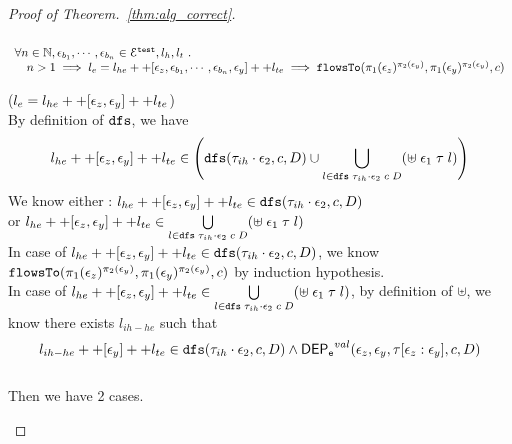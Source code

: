 \begin{proof}[Proof of Theorem.~\ref{thm:alg_correct}]
\begin{case}
\begin{equation}
  \end{equation}
%
%
\begin{equation}
\begin{array}{l}
  \forall n \in \mathbb{N}, \mathtt{\epsilon}_{b_1}, \cdots, \mathtt{\epsilon}_{b_n} \in \mathcal{E}^{\mathtt{{test}}}, l_h, l_t ~.~
   \\ \quad 
   n > 1 \implies
   l_e = l_{he} ++ {[\mathtt{\epsilon}_z, \mathtt{\epsilon}_{b_1}, \cdots, \mathtt{\epsilon}_{b_n}, \mathtt{\epsilon}_y]} ++ l_{te}
  \implies \mathtt{flowsTo}(\pi_1(\mathtt{\epsilon}_z)^{\pi_2(\mathtt{\epsilon}_y)}, \pi_1(\mathtt{\epsilon}_y)^{\pi_2(\mathtt{\epsilon}_y)}, c)
\end{array}
\end{equation}
%
\begin{subcase}($l_e = l_{he} ++ [\mathtt{\epsilon}_z, \mathtt{\epsilon}_y] ++ l_{te}$)
\\
By definition of $\mathtt{dfs}$, we have
%
\[
  l_{he} ++ [\event_z, \event_y] ++ l_{te}  \in 
  \left(  \kw{dfs}(\trace_{ih} \cdot \event_2, c, D) \cup
  \bigcup\limits_{l \in \kw{dfs} \eapp {\trace_{ih} \cdot \event_2} \eapp c \eapp D } (\uplus \eapp \event_1 \eapp \trace \eapp l)
  \right)
\]
We know either :
$l_{he} ++ [\mathtt{\epsilon}_z, \mathtt{\epsilon}_y] ++ l_{te}  \in \mathtt{dfs}(\mathtt{\tau}_{ih} \cdot \mathtt{\epsilon}_2, c, D)$
\\
or $l_{he} ++ [\mathtt{\epsilon}_z, \mathtt{\epsilon}_y] ++ l_{te}  \in  
\bigcup\limits_{l \in \mathtt{dfs} \; {\mathtt{\tau}_{ih} \cdot \mathtt{\epsilon}_2} \; c \; D } (\uplus \; \mathtt{\epsilon}_1 \; \mathtt{\tau} \; l)$
\\
In case of $l_{he} ++ [\mathtt{\epsilon}_z, \mathtt{\epsilon}_y] ++ l_{te}  \in \mathtt{dfs}(\mathtt{\tau}_{ih} \cdot \mathtt{\epsilon}_2, c, D)$, we know 
$\mathtt{flowsTo}(\pi_1(\mathtt{\epsilon}_z)^{\pi_2(\mathtt{\epsilon}_y)}, \pi_1(\mathtt{\epsilon}_y)^{\pi_2(\mathtt{\epsilon}_y)}, c)$ by induction hypothesis.
\\
%
In case of $l_{he} ++ [\mathtt{\epsilon}_z, \mathtt{\epsilon}_y] ++ l_{te}  \in  
\bigcup\limits_{l \in \mathtt{dfs} \; {\mathtt{\tau}_{ih} \cdot \mathtt{\epsilon}_2} \; c \; D } (\uplus \; \mathtt{\epsilon}_1 \; \mathtt{\tau} \; l)$,
by definition of $\uplus$, we know there exists $l_{ih-he}$ such that
\[l_{ih-he} ++ [\mathtt{\epsilon}_y] ++ l_{te} \in \mathtt{dfs}(\mathtt{\tau}_{ih} \cdot \mathtt{\epsilon}_2, c, D) \land 
\mathsf{DEP_{\mathtt{e}}}^{val}(\mathtt{\epsilon}_z, \mathtt{\epsilon}_y, \mathtt{\tau}[\mathtt{\epsilon}_z:\mathtt{\epsilon}_y], c, D)\]
\\
Then we have 2 cases.
\begin{subsubcase}

\end{subsubcase}
\end{subcase}
\end{case}
\end{proof}

